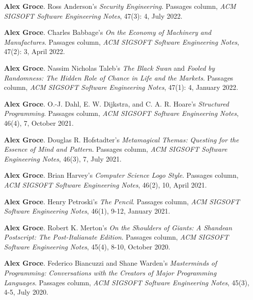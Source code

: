 \documentclass[ComputerScience]{vita}
\begin{document}
\begin{vita}
\begin{Columns, Book Reviews, and Magazine Articles}
\item {\bf Alex Groce}. 
\newblock Ross Anderson's \emph{Security Engineering}. 
\newblock Passages column, \emph{ACM SIGSOFT Software Engineering 
  Notes}, 47(3): 4, July 2022.
  
\item {\bf Alex Groce}. 
\newblock Charles Babbage's \emph{On the Economy of Machinery and Manufactures}. 
\newblock Passages column, \emph{ACM SIGSOFT Software Engineering 
  Notes}, 47(2): 3, April 2022.
  
\item {\bf Alex Groce}. 
\newblock Nassim Nicholas Taleb’s \emph{The Black Swan} and \emph{Fooled by Randomness: The Hidden Role of Chance in Life and the Markets}. 
\newblock Passages column, \emph{ACM SIGSOFT Software Engineering 
  Notes}, 47(1): 4, January 2022.

\item {\bf Alex Groce}. 
\newblock O.-J. Dahl, E. W. Dijkstra, and C. A. R. Hoare’s \emph{Structured Programming}.
\newblock Passages column, \emph{ACM SIGSOFT Software Engineering 
  Notes}, 46(4), 7, October 2021.

\item {\bf Alex Groce}. 
\newblock Douglas R. Hofstadter's \emph{Metamagical Themas: Questing for the Essence of Mind and Pattern}. 
\newblock Passages column, \emph{ACM SIGSOFT Software Engineering 
  Notes}, 46(3), 7, July 2021.
  
\item {\bf Alex Groce}. 
\newblock Brian Harvey's \emph{Computer Science Logo Style}. 
\newblock Passages column, \emph{ACM SIGSOFT Software Engineering 
  Notes}, 46(2), 10, April 2021.

\item {\bf Alex Groce}. 
\newblock Henry Petroski's \emph{The Pencil}. 
\newblock Passages column, \emph{ACM SIGSOFT Software Engineering 
  Notes}, 46(1), 9-12, January 2021.
  
\item {\bf Alex Groce}. 
\newblock Robert K. Merton's \emph{On the Shoulders of Giants: A
  Shandean Postscript: The Post-Italianate Edition}. 
\newblock Passages column, \emph{ACM SIGSOFT Software Engineering 
  Notes}, 45(4), 8-10, October 2020.

\item {\bf Alex Groce}. 
\newblock Federico Biancuzzi and Shane Warden's \emph{Masterminds of 
  Programming: Conversations with the Creators of Major Programming Languages}. 
\newblock Passages column, \emph{ACM SIGSOFT Software Engineering 
  Notes}, 45(3), 4-5, July 2020.
  

\end{Columns, Book Reviews, and Magazine Articles}
\end{vita}
\end{document}

